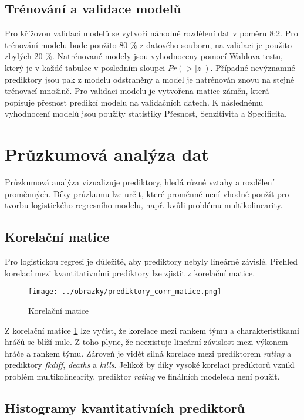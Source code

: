 \subsection{Trénování a validace modelů}
Pro křížovou validaci modelů se vytvoří náhodné rozdělení dat v poměru 8:2. Pro trénování modelu bude použito 80 \% z datového souboru, na validaci je použito zbylých 20 \%.
Natrénované modely jsou vyhodnoceny pomocí Waldova testu, který je v každé tabulce v posledním sloupci $Pr(>|z|)$. Případné nevýznamné prediktory jsou pak z modelu
odstraněny a model je natrénován znovu na stejné trénovací množině. Pro validaci modelu je vytvořena matice záměn, která popisuje přesnost predikcí modelu na validačních
datech. K následnému vyhodnocení modelů jsou použity statistiky Přesnost, Senzitivita a Specificita. 

\newpage
\section{Průzkumová analýza dat}
Průzkumová analýza vizualizuje prediktory, hledá různé vztahy a rozdělení proměnných. Díky průzkumu lze určit, které proměnné není vhodné použít pro tvorbu
logistického regresního modelu, např. kvůli problému multikolinearity.

\subsection{Korelační matice}
Pro logistickou regresi je důležité, aby prediktory nebyly lineárně závislé. Přehled korelací mezi kvantitativními prediktory lze zjistit z korelační matice.

\begin{figure}[H]
    \centering
    \texttt{[image: ../obrazky/prediktory\_corr\_matice.png]}
    \caption{Korelační matice} 
    \label{fig:korelacni_matice}
\end{figure}

Z korelační matice \ref{fig:korelacni_matice} lze vyčíst, že korelace mezi rankem týmu a charakteristikami hráčů se blíží nule. Z toho plyne, že neexistuje lineární závislost mezi
výkonem hráče a rankem týmu. Zároveň je vidět silná korelace mezi prediktorem \textit{rating} a prediktory \textit{fkdiff}, \textit{deaths} a \textit{kills}.
Jelikož by díky vysoké korelaci prediktorů vznikl problém multikolinearity, prediktor \textit{rating} ve finálních modelech není použit.

\subsection{Histogramy kvantitativních prediktorů}

